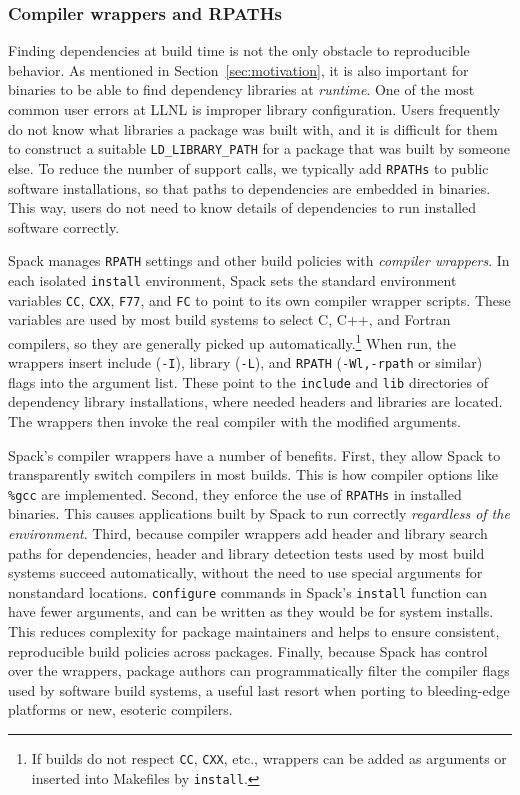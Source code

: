 \subsubsection{Compiler wrappers and RPATHs}
Finding dependencies at build time is not the only obstacle to reproducible
behavior.  As mentioned in Section~\ref{sec:motivation}, it is also important
for binaries to be able to find dependency libraries at {\it runtime}.
One of the most common user errors at LLNL is improper library configuration.
Users frequently do not know what libraries a package was built with, and
it is difficult for them to construct a suitable {\tt LD\_LIBRARY\_PATH} for
a package that was built by someone else.  To reduce the number of support calls,
we typically add {\tt RPATHs} to public software installations, so that paths
to dependencies are embedded in binaries. This way, users do not need to know
details of dependencies to run installed software correctly.

Spack manages {\tt RPATH} settings and other build policies with
{\it compiler wrappers}.
In each isolated {\tt install} environment, Spack sets the standard
environment variables
{\tt CC}, {\tt CXX}, {\tt F77}, and {\tt FC} to point to its own compiler
wrapper scripts.  These variables are used by most build systems to select 
C, C++, and Fortran compilers, so they are generally picked up
automatically.\footnote{If builds do not respect {\tt CC}, {\tt CXX}, etc.,
wrappers can be added as arguments or inserted into Makefiles
by {\tt install}.}
When run, the wrappers insert include ({\tt -I}), library ({\tt -L}), and
{\tt RPATH} ({\tt -Wl,-rpath} or similar) flags into the argument list.
These point to the {\tt include} and {\tt lib} directories of dependency
library installations, where needed headers and libraries are located.
The wrappers then invoke the real compiler with the modified arguments.

Spack's compiler wrappers have a number of benefits.  First, they allow
Spack to transparently switch compilers in most builds.  This is how
compiler options like {\tt \%gcc} are implemented.  Second, they enforce the
use of {\tt RPATHs} in
installed binaries.  This causes applications built by Spack to run correctly
{\it regardless of the environment}.  Third, because compiler wrappers add
header and library search paths for dependencies, header and library detection
tests used by most build systems succeed automatically, without
the need to use special arguments for nonstandard locations.  {\tt configure}
commands in Spack's {\tt install} function can have fewer arguments, and can
be written as they would be for system installs.  This reduces complexity
for package maintainers and helps to ensure consistent, reproducible
build policies across packages.  Finally, because Spack has control over the
wrappers, package authors can programmatically filter the compiler flags
used by software build systems, a useful last resort when porting to
bleeding-edge platforms or new, esoteric compilers.

